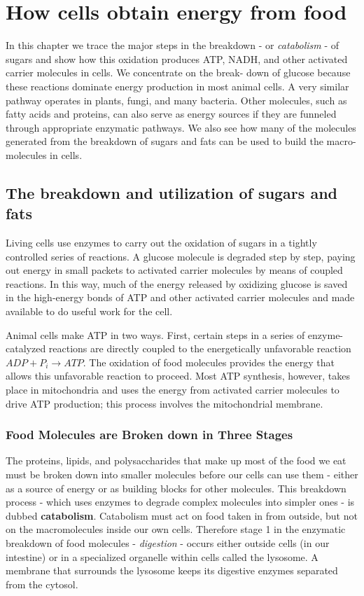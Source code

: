 \chapter{How cells obtain energy from food}

In this chapter we trace the major steps in the breakdown - or \textit{catabolism} -
of sugars and show how this oxidation produces ATP, NADH, and
other activated carrier molecules in cells. We concentrate on the break-
down of glucose because these reactions dominate energy production in
most animal cells. A very similar pathway operates in plants, fungi, and
many bacteria. Other molecules, such as fatty acids and proteins, can
also serve as energy sources if they are funneled through appropriate
enzymatic pathways. We also see how many of the molecules generated
from the breakdown of sugars and fats can be used to build the macro-
molecules in cells.

\section{The breakdown and utilization of sugars and fats}

Living cells use enzymes to carry out the oxidation of sugars in
a tightly controlled series of reactions. A
glucose molecule is degraded step by step, paying out energy in small
packets to activated carrier molecules by means of coupled reactions. In
this way, much of the energy released by oxidizing glucose is saved in
the high-energy bonds of ATP and other activated carrier molecules and
made available to do useful work for the cell.


Animal cells make ATP in two ways. First, certain steps in a series of
enzyme-catalyzed reactions are directly coupled to the energetically
unfavorable reaction $ADP + P_{i} \rightarrow ATP$. The oxidation of food molecules
provides the energy that allows this unfavorable reaction to proceed. Most
ATP synthesis, however, takes place in mitochondria and uses the energy
from activated carrier molecules to drive ATP production; this process
involves the mitochondrial membrane.

\subsection{Food Molecules are Broken down in Three Stages}

The proteins, lipids, and polysaccharides that make up most of the food
we eat must be broken down into smaller molecules before our cells can
use them - either as a source of energy or as building blocks for other
molecules. This breakdown process - which uses enzymes to degrade
complex molecules into simpler ones - is dubbed \textbf{catabolism}. Catabolism
must act on food taken in from outside, but not on the macromolecules
inside our own cells. Therefore stage 1 in the enzymatic breakdown of
food molecules - \textit{digestion} - occurs either outside cells (in our intestine) or
in a specialized organelle within cells called the lysosome. A membrane
that surrounds the lysosome keeps its digestive enzymes separated from
the cytosol.

